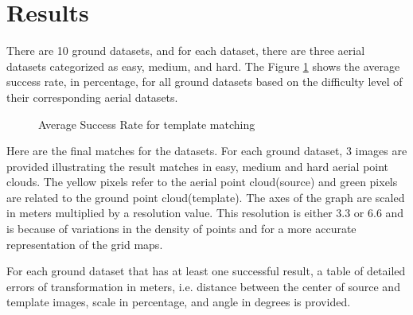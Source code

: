 \documentclass[11pt]{article}
\begin{document}
    \section{Results}
    There are 10 ground datasets, and for each dataset, there are three aerial datasets categorized as easy, medium,
    and hard. The Figure \ref{fig:asr} shows the average success rate, in percentage, for all ground datasets based on the
    difficulty level of their corresponding aerial datasets.
    \begin{figure}
        \centering
        \label{fig:asr}
        \caption{Average Success Rate for template matching}
    \end{figure}

    Here are the final matches for the datasets. For each ground dataset, 3 images are provided illustrating the
    result matches in easy, medium and hard aerial point clouds. The yellow pixels refer to the aerial point cloud(source)
    and green pixels are related to the ground point cloud(template). The axes of the graph are scaled in meters multiplied
    by a resolution value. This resolution is either 3.3 or 6.6 and is because of variations in the density of points
    and for a more accurate representation of the grid maps.

    For each ground dataset that has at least one successful result, a table of detailed errors of transformation
    in meters, i.e. distance between the center of source and template images, scale in percentage, and angle in
    degrees is provided.
\end{document}
